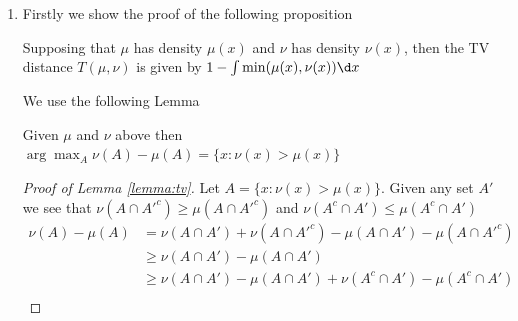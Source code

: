 \documentclass{article}
\begin{document}
\begin{enumerate}
\begin{align}
        \end{align}
        Similarly for the first term we get
        \begin{align}
            \int_{\mathbb X \times \mathbb X} S_1 &=
                \int_{\mathbb X \times \mathbb X} 
                \pi(\d x)\eta(\d y)K(x,\d x')\eta(\d y')
                \left[1 - \min\left\{1, \frac{\gamma(y')\eta(x')}{\gamma(x')\eta(y')}\right\}\right] \\
            &= \pi(\d x')\eta(\d y')
                        \left[1 - \min\left\{1, \frac{\gamma(y')\eta(x')}{\gamma(x')\eta(y')}\right\}\right] \\
            &= \pi(\d x)\eta(\d y') - \frac 1 Z \min\left\{
                \gamma(x')\eta(y'),\gamma(y')\eta(x') 
            \right\} \d x' \d y'
        \end{align}
        The second term cancels with the above. We get
        \begin{align}
            \int_{\mathbb X \times \mathbb X} S_1 + S_2 &= 
                \pi(\d x')\eta(\d y') = \bar \pi(\d x', \d y')
        \end{align}
        Therefore $\bar K$ is $\bar \pi$-invariant.
    \item Firstly we show the proof of the following proposition
    \begin{proposition}\label{prop:tv}
        Supposing that $\mu$ has density $\mu(x)$ and $\nu$ has density $\nu(x)$,
        then the TV distance $T(\mu, \nu)$ is given by $1 - \int \min(\mu(x),\nu(x)) \d x$
    \end{proposition}
    We use the following Lemma
    \begin{lemma}\label{lemma:tv}
        Given $\mu$ and $\nu$ above then
        $\arg\max_A \nu(A) - \mu(A) = \{ x : \nu(x) > \mu(x) \}$ 
    \end{lemma}
    \begin{proof}[Proof of Lemma \ref{lemma:tv}]
        Let $A = \{ x : \nu(x) > \mu(x) \}$. Given any set $A'$ we see that
            $\nu(A \cap A'^c) \geq \mu(A \cap A'^c)$ and
            $\nu(A^c \cap A') \leq \mu(A^c \cap A')$
        \begin{align}
            \nu(A) - \mu(A) &= 
            \nu(A \cap A') + \nu(A \cap A'^c) 
            - \mu(A \cap A') - \mu(A \cap A'^c) \\
            &\geq \nu(A \cap A') - \mu(A \cap A') \\
            &\geq \nu(A \cap A') - \mu(A \cap A') + 
            \nu(A^c \cap A') - \mu(A^c \cap A') \\

\end{align}
\end{proof}
\end{enumerate}
\end{document}
